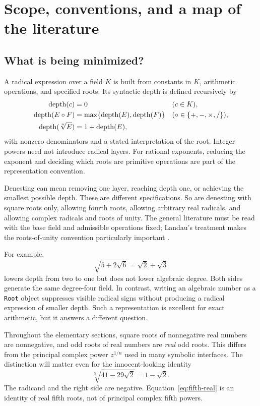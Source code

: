 \documentclass[11pt,a4paper]{article}
\numberwithin{equation}{section}
\theoremstyle{definition}\newtheorem{definition}[theorem]{Definition}
\theoremstyle{remark}\newtheorem{remark}[theorem]{Remark}
\begin{document}
\section{Scope, conventions, and a map of the literature}
\label{sec:scope}

\subsection{What is being minimized?}
A radical expression over a field $K$ is built from constants in $K$, arithmetic operations, and specified roots. Its syntactic depth is defined recursively by
\begin{align}
\operatorname{depth}(c)&=0 &&(c\in K),\\
\operatorname{depth}(E\mathbin\circ F)&=\max\{\operatorname{depth}(E),\operatorname{depth}(F)\}
 &&(\circ\in\{+,-,\times,/\}),\\
\operatorname{depth}(\sqrt[n]{E})&=1+\operatorname{depth}(E),
\end{align}
with nonzero denominators and a stated interpretation of the root. Integer powers need not introduce radical layers. For rational exponents, reducing the exponent and deciding which roots are primitive operations are part of the representation convention.

Denesting can mean removing one layer, reaching depth one, or achieving the smallest possible depth. These are different specifications. So are denesting with square roots only, allowing fourth roots, allowing arbitrary real radicals, and allowing complex radicals and roots of unity. The general literature must be read with the base field and admissible operations fixed; Landau's treatment makes the roots-of-unity convention particularly important \cite{landau92,landauNote,horng99,bloemer00}.

For example,
\begin{equation}\label{eq:standard}
\sqrt{5+2\sqrt6}=\sqrt2+\sqrt3
\end{equation}
lowers depth from two to one but does not lower algebraic degree. Both sides generate the same degree-four field. In contrast, writing an algebraic number as a \texttt{Root} object suppresses visible radical signs without producing a radical expression of smaller depth. Such a representation is excellent for exact arithmetic, but it answers a different question.

Throughout the elementary sections, square roots of nonnegative real numbers are nonnegative, and odd roots of real numbers are \emph{real} odd roots. This differs from the principal complex power $z^{1/n}$ used in many symbolic interfaces. The distinction will matter even for the innocent-looking identity
\begin{equation}\label{eq:fifth-real}
\sqrt[5]{41-29\sqrt2}=1-\sqrt2.
\end{equation}
The radicand and the right side are negative. Equation~\eqref{eq:fifth-real} is an identity of real fifth roots, not of principal complex fifth powers.
\end{document}
